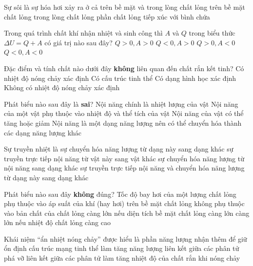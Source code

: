 \begin{ex}
Sự sôi là sự hóa hơi xảy ra ở
\choice
{\True cả trên bề mặt và trong lòng chất lỏng}
{trên bề mặt chất lỏng}
{trong lòng chất lỏng}
{phần chất lỏng tiếp xúc với bình chứa}
\loigiai{}
\end{ex}

\begin{ex}
Trong quá trình chất khí nhận nhiệt và sinh công thì $A$ và $Q$ trong biểu thức $\Delta U=Q+A$ có giá trị nào sau đây?
\choice
{$Q>0, A>0$}
{$Q<0, A>0$}
{\True $Q>0, A<0$}
{$Q<0, A<0$}
\loigiai{}
\end{ex}

\begin{ex}
Đặc điểm và tính chất nào dưới đây \textbf{không} liên quan đến chất rắn kết tinh?
\choice
{Có nhiệt độ nóng chảy xác định}
{Có cấu trúc tinh thể}
{Có dạng hình học xác định}
{\True Không có nhiệt độ nóng chảy xác định}
\loigiai{}
\end{ex}

\begin{ex}
Phát biểu nào sau đây là \textbf{sai}?
\choice
{\True Nội năng chính là nhiệt lượng của vật}
{Nội năng của một vật phụ thuộc vào nhiệt độ và thể tích của vật}
{Nội năng của vật có thể tăng hoặc giảm}
{Nội năng là một dạng năng lượng nên có thể chuyển hóa thành các dạng năng lượng khác}
\loigiai{}
\end{ex}

\begin{ex}
Sự truyền nhiệt là
\choice
{sự chuyển hóa năng lượng từ dạng này sang dạng khác}
{\True sự truyền trực tiếp nội năng từ vật này sang vật khác}
{sự chuyển hóa năng lượng từ nội năng sang dạng khác}
{sự truyền trực tiếp nội năng và chuyển hóa năng lượng từ dạng này sang dạng khác}
\loigiai{}
\end{ex}

\begin{ex}
Phát biểu nào sau đây \textbf{không} đúng? Tốc độ bay hơi của một lượng chất lỏng
\choice
{phụ thuộc vào áp suất của khí (hay hơi) trên bề mặt chất lỏng}
{\True không phụ thuộc vào bản chất của chất lỏng}
{càng lớn nếu diện tích bề mặt chất lỏng càng lớn}
{càng lớn nếu nhiệt độ chất lỏng càng cao}
\loigiai{}
\end{ex}

\begin{ex}
Khái niệm “ẩn nhiệt nóng chảy” được hiểu là phần năng lượng nhận thêm để
\choice
{giữ ổn định cấu trúc mạng tinh thể}
{làm tăng năng lượng liên kết giữa các phân tử}
{\True phá vỡ liên kết giữa các phân tử}
{làm tăng nhiệt độ của chất rắn khi nóng chảy}
\loigiai{}
\end{ex}

